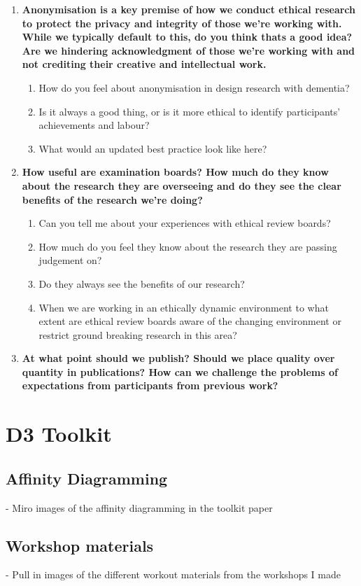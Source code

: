 \begin{enumerate}
    \item \textbf{Anonymisation is a key premise of how we conduct ethical research to protect the privacy and integrity of those we’re working with. While we typically default to this, do you think thats a good idea? Are we hindering acknowledgment of those we’re working with and not crediting their creative and intellectual work.}
    \begin{enumerate}
        \item How do you feel about anonymisation in design research with dementia?
        \item Is it always a good thing, or is it more ethical to identify participants’ achievements and labour?
        \item What would an updated best practice look like here?
    \end{enumerate}

    \item \textbf{How useful are examination boards? How much do they know about the research they are overseeing and do they see the clear benefits of the research we’re doing?}
    \begin{enumerate}
        \item Can you tell me about your experiences with ethical review boards?
        \item How much do you feel they know about the research they are passing judgement on?
        \item Do they always see the benefits of our research?
        \item When we are working in an ethically dynamic environment to what extent are ethical review boards aware of the changing environment or restrict ground breaking research in this area?
    \end{enumerate}
 
    \item \textbf{At what point should we publish? Should we place quality over quantity in publications? How can we challenge the problems of expectations from participants from previous work?}
\end{enumerate}

\chapter{D3 Toolkit}

\section{Affinity Diagramming}
\label{app:AD}
- Miro images of the affinity diagramming in the toolkit paper

\section{Workshop materials}
\label{app:ToolkitMaterials}
- Pull in images of the different workout materials from the workshops I made